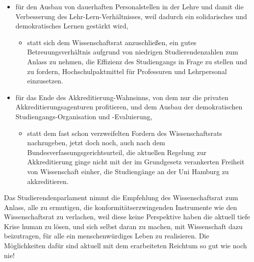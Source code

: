 \documentclass[ngerman,headheight=70pt]{scrartcl}
\newenvironment{myitemize}{\begin{itemize}\itemsep -2pt}{\end{itemize}}
\begin{document}
\begin{myitemize}
        \begin{myitemize}
            \item statt der Empfehlung des Wissenschaftsrat nachzukommen, in den
            Lehramtsstudiengängen ein verpflichtendes Auslandssemester einzuführen,
            besonders ohne jegliche Reflexion der prekären Lage der Studierenden.
        \end{myitemize}
        \item für den Ausbau von dauerhaften Personalstellen in der Lehre und
        damit die Verbesserung des Lehr-Lern-Verhältnisses, weil dadurch ein
        solidarisches und demokratisches Lernen gestärkt wird,
        \begin{myitemize}
            \item statt sich dem Wissenschaftsrat anzuschließen, ein gutes
            Betreuungsverhältnis aufgrund von niedrigen Studierendenzahlen zum
            Anlass zu nehmen, die Effizienz des Studiengangs in Frage zu stellen
            und zu fordern, Hochschulpaktmittel für Professuren und Lehrpersonal
            einzusetzen.
        \end{myitemize}
        \item für das Ende des Akkreditierung-Wahnsinns, von dem nur die privaten
        Akkreditierungsagenturen profitieren, und dem Ausbau der demokratischen
        Studiengangs-Organisation und -Evaluierung,
        \begin{myitemize}
            \item statt dem fast schon verzweifelten Fordern des Wissenschaftsrats
            nachzugeben, jetzt doch noch, auch nach dem
            Bundesverfassungsgerichtsurteil, die aktuellen Regelung zur
            Akkreditierung ginge nicht mit der im Grundgesetz verankerten Freiheit
            von Wissenschaft einher, die Studiengänge an der Uni Hamburg zu
            akkreditieren.
        \end{myitemize}
    \end{myitemize}

    Das Studierendenparlament nimmt die Empfehlung des Wissenschaftsrat zum Anlass,
    alle zu ermutigen, die konformitätserzwingenden Instrumente wie den
    Wissenschaftsrat zu verlachen, weil diese keine Perspektive haben die aktuell
    tiefe Krise human zu lösen, und sich selbst daran zu machen, mit Wissenschaft
    dazu beizutragen, für alle ein menschenwürdiges Leben zu realisieren. Die
    Möglichkeiten dafür sind aktuell mit dem erarbeiteten Reichtum so gut wie
    noch nie!
\end{document}

